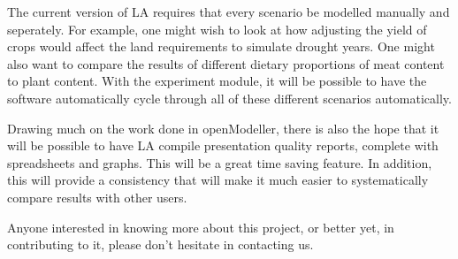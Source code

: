 The current version of LA requires that every scenario be modelled
manually and seperately.  For example, one might wish to look at how adjusting
the yield of crops would affect the land requirements to simulate drought
years.  One might also want to compare the results of different dietary
proportions of meat content to plant content.  With the experiment module, it
will be possible to have the software automatically cycle through all of these
different scenarios automatically.

Drawing much on the work done in openModeller, there is also the hope that it
will be possible to have LA compile presentation quality reports,
complete with spreadsheets and graphs.  This will be a great time saving
feature.  In addition, this will provide a consistency that will make it much
easier to systematically compare results with other users.

Anyone interested in knowing more about this project, or better yet, in
contributing to it, please don't hesitate in contacting us.











\begin{footnotesize}



\end{footnotesize}


\address{Jason Jorgenson\\ University of Liverpool\\
\url{http://www.arkygeek.com} (under development)\\ }

\address{Tim Sutton\\ Centro de Referncia em Informao Ambiental, CRIA\\ \url{http://cria.org.br}\\
}

